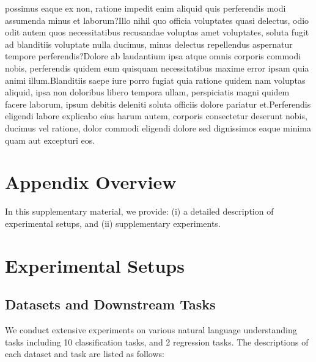 \documentclass[letterpaper]{article} %
\begin{document}
possimus eaque ex non, ratione impedit enim aliquid quis perferendis modi assumenda minus et laborum?Illo nihil quo officia voluptates quasi delectus, odio odit autem quos necessitatibus recusandae voluptas amet voluptates, soluta fugit ad blanditiis voluptate nulla ducimus, minus delectus repellendus aspernatur tempore perferendis?Dolore ab laudantium ipsa atque omnis corporis commodi nobis, perferendis quidem eum quisquam necessitatibus maxime error ipsam quia animi illum.Blanditiis saepe iure porro fugiat quia ratione quidem nam voluptas aliquid, ipsa non doloribus libero tempora ullam, perspiciatis magni quidem facere laborum, ipsum debitis deleniti soluta officiis dolore pariatur et.Perferendis eligendi labore explicabo eius harum autem, corporis consectetur deserunt nobis, ducimus vel ratione, dolor commodi eligendi dolore sed dignissimos eaque minima quam aut excepturi eos.\clearpage



\clearpage
\appendix

\section*{Appendix Overview}
In this supplementary material, we provide:
(i) a detailed description of experimental setups,
and (ii) supplementary experiments.

\section{Experimental Setups}
\subsection{Datasets and Downstream Tasks}

We conduct extensive experiments on various natural language understanding tasks including 10 classification  tasks, and 2 regression tasks. The descriptions of each dataset and task are listed as follows:
\end{document}
